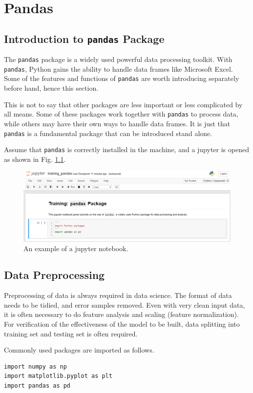 \chapter{Pandas} \label{ch:pandas}

\section{Introduction to \texttt{pandas} Package}

The \verb|pandas| package is a widely used powerful data processing toolkit. With \verb|pandas|, Python gains the ability to handle data frames like Microsoft Excel. Some of the features and functions of \verb|pandas| are worth introducing separately before hand, hence this section.

This is not to say that other packages are less important or less complicated by all means. Some of these packages work together with \verb|pandas| to process data, while others may have their own ways to handle data frames. It is just that \verb|pandas| is a fundamental package that can be introduced stand alone.

Assume that \verb|pandas| is correctly installed in the machine, and a jupyter is opened as shown in Fig. \ref{ch:python:fig:jupyter_cover}.

\begin{figure}
	\centering
	\includegraphics[width=350pt]{chapters/ch-python/figures/jupyter_cover.png}
	\caption{An example of a jupyter notebook.} \label{ch:python:fig:jupyter_cover}
\end{figure}


\section{Data Preprocessing}

Preprocessing of data is always required in data science. The format of data needs to be tidied, and error samples removed. Even with very clean input data, it is often necessary to do feature analysis and scaling (feature normalization). For verification of the effectiveness of the model to be built, data splitting into training set and testing set is often required.

Commonly used packages are imported as follows.
\begin{lstlisting}
import numpy as np
import matplotlib.pyplot as plt
import pandas as pd
\end{lstlisting}